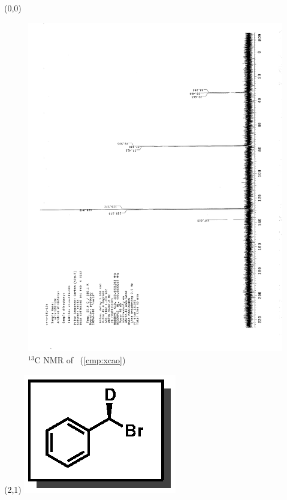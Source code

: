\clearpage
\begin{textblock}{20}(0,0)
\begin{figure}[htb]
\caption{$^{13}$C NMR of  \CMPxcao\ (\ref{cmp:xcao})}
\includegraphics[scale=0.75, trim = 0mm 0mm 0mm 5mm,
clip]{chp_alkylation/images/nmr/xcaoC}
\vspace{-100pt}
\end{figure}
\end{textblock}
\begin{textblock}{1}(2,1)
\includegraphics[scale=0.8, angle=90]{chp_alkylation/images/xcao}
\end{textblock}
\clearpage

